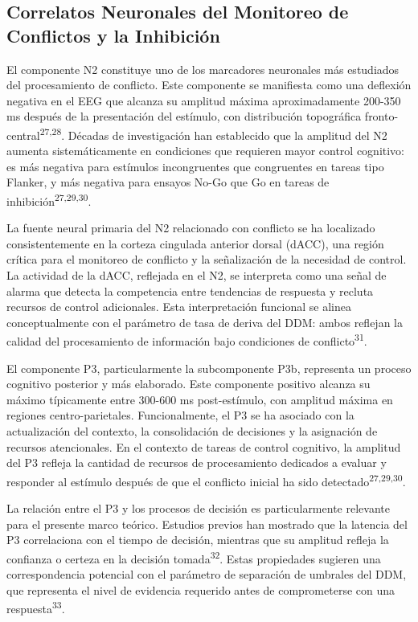 \documentclass[
  spanish,
  10pt,
]{article}
\begin{document}
\subsection{Correlatos Neuronales del Monitoreo de Conflictos y la
Inhibición}\label{correlatos-neuronales-del-monitoreo-de-conflictos-y-la-inhibiciuxf3n}

El componente N2 constituye uno de los marcadores neuronales más
estudiados del procesamiento de conflicto. Este componente se manifiesta
como una deflexión negativa en el EEG que alcanza su amplitud máxima
aproximadamente 200-350 ms después de la presentación del estímulo, con
distribución topográfica fronto-central\textsuperscript{27,28}. Décadas
de investigación han establecido que la amplitud del N2 aumenta
sistemáticamente en condiciones que requieren mayor control cognitivo:
es más negativa para estímulos incongruentes que congruentes en tareas
tipo Flanker, y más negativa para ensayos No-Go que Go en tareas de
inhibición\textsuperscript{27,29,30}.

La fuente neural primaria del N2 relacionado con conflicto se ha
localizado consistentemente en la corteza cingulada anterior dorsal
(dACC), una región crítica para el monitoreo de conflicto y la
señalización de la necesidad de control. La actividad de la dACC,
reflejada en el N2, se interpreta como una señal de alarma que detecta
la competencia entre tendencias de respuesta y recluta recursos de
control adicionales. Esta interpretación funcional se alinea
conceptualmente con el parámetro de tasa de deriva del DDM: ambos
reflejan la calidad del procesamiento de información bajo condiciones de
conflicto\textsuperscript{31}.

El componente P3, particularmente la subcomponente P3b, representa un
proceso cognitivo posterior y más elaborado. Este componente positivo
alcanza su máximo típicamente entre 300-600 ms post-estímulo, con
amplitud máxima en regiones centro-parietales. Funcionalmente, el P3 se
ha asociado con la actualización del contexto, la consolidación de
decisiones y la asignación de recursos atencionales. En el contexto de
tareas de control cognitivo, la amplitud del P3 refleja la cantidad de
recursos de procesamiento dedicados a evaluar y responder al estímulo
después de que el conflicto inicial ha sido
detectado\textsuperscript{27,29,30}.

La relación entre el P3 y los procesos de decisión es particularmente
relevante para el presente marco teórico. Estudios previos han mostrado
que la latencia del P3 correlaciona con el tiempo de decisión, mientras
que su amplitud refleja la confianza o certeza en la decisión
tomada\textsuperscript{32}. Estas propiedades sugieren una
correspondencia potencial con el parámetro de separación de umbrales del
DDM, que representa el nivel de evidencia requerido antes de
comprometerse con una respuesta\textsuperscript{33}.
\end{document}
